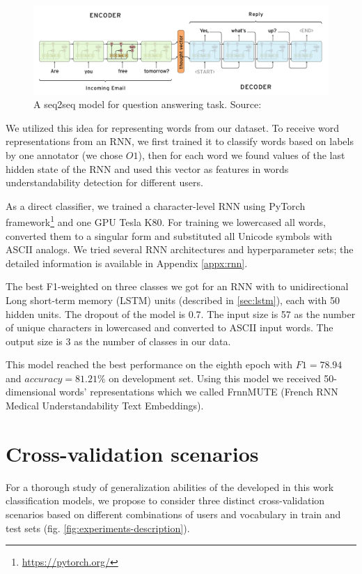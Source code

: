 \begin{figure}[h]
    \centering
    \includegraphics[width=14cm]{Images/seq2seq.png}
    \caption{A seq2seq model for question answering task. Source: \citep{Britz-2016}}
    \label{fig:seq2seq}
\end{figure} 

We utilized this idea for representing words from our dataset. To receive word representations from an RNN, we first trained it to classify words based on labels by one annotator (we chose $O1$), then for each word we found values of the last hidden state of the RNN and used this vector as features in words understandability detection for different users.

As a direct classifier, we trained a character-level RNN using PyTorch framework\footnote{\url{https://pytorch.org/}} and one GPU Tesla K80. For training we lowercased all words, converted them to a singular form and substituted all Unicode symbols with ASCII analogs.  We tried several RNN architectures and hyperparameter sets; the detailed information is available in Appendix \ref{appx:rnn}. 

The best F1-weighted on three classes we got for an RNN with to unidirectional Long short-term memory (LSTM) units (described in \ref{sec:lstm}), each with 50 hidden units. The dropout of the model is 0.7. The input size is 57 as the number of unique characters in lowercased and converted to ASCII input words. The output size is 3 as the number of classes in our data.

This model reached the best performance on the eighth epoch with $F1= 78.94$ and $accuracy = 81.21\%$ on development set. Using this model we received 50-dimensional words' representations which we called FrnnMUTE (French RNN Medical Understandability Text Embeddings). 


\section{Cross-validation scenarios}
For a thorough study of generalization abilities of the developed in this work classification models, we propose to consider three distinct cross-validation scenarios based on different combinations of users and vocabulary in train and test sets (fig. \ref{fig:experiments-description}).

